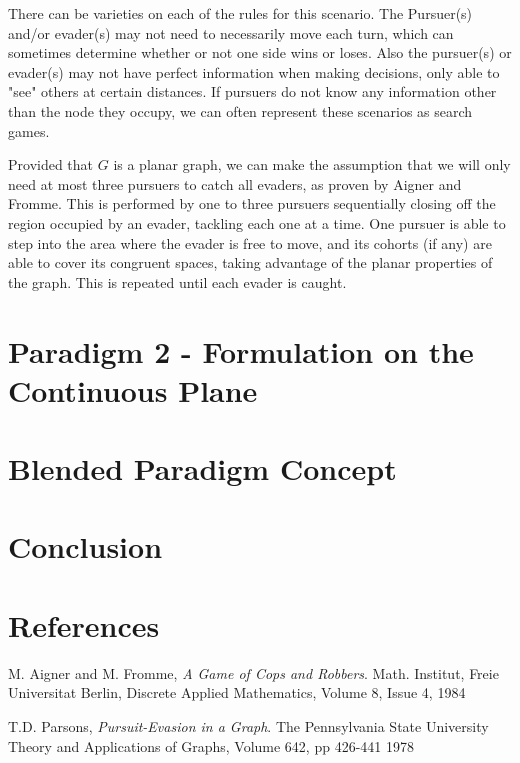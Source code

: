 \documentclass{article}
\begin{document}
There can be varieties on each of the rules for this scenario. The Pursuer(s) and/or evader(s) may not need to necessarily move each turn, which can sometimes determine whether or not one side wins or loses. Also the pursuer(s) or evader(s) may not have perfect information when making decisions, only able to "see" others at certain distances. If pursuers do not know any information other than the node they occupy, we can often represent these scenarios as search games. \cite{parsons}

Provided that \(G\) is a planar graph, we can make the assumption that we will only need at most three pursuers to catch all evaders, as proven by Aigner and Fromme. This is performed by one to three pursuers sequentially closing off the region occupied by an evader, tackling each one at a time. One pursuer is able to step into the area where the evader is free to move, and its cohorts (if any) are able to cover its congruent spaces, taking advantage of the planar properties of the graph. This is repeated until each evader is caught. \cite{copsRobbers}

\section{Paradigm 2 - Formulation on the Continuous Plane}

\section{Blended Paradigm Concept}

\section{Conclusion}

\section{References}

\begin{thebibliography}{9}

  M. Aigner and M. Fromme,
  \emph{A Game of Cops and Robbers}.
  Math. Institut, Freie Universitat Berlin,
  Discrete Applied Mathematics, Volume 8, Issue 4,
  1984
  
  T.D. Parsons,
  \emph{Pursuit-Evasion in a Graph}.
  The Pennsylvania State University
  Theory and Applications of Graphs, Volume 642, pp 426-441
  1978

\end{thebibliography}
\end{document}

